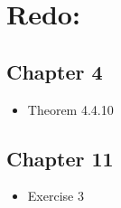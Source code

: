 \documentclass[a4paper, oneside]{book}
\begin{document}

\clearpage
\section{Redo:}
\subsection*{Chapter 4}
\begin{itemize}
\item Theorem 4.4.10
\end{itemize}
\subsection*{Chapter 11}
\begin{itemize}
\item Exercise 3
\end{itemize}
\end{document}
